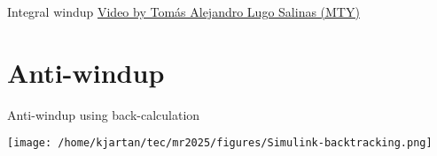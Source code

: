 \documentclass[presentation,aspectratio=169, usenames, dvipsnames]{beamer}
\begin{document}
\begin{frame}[label={sec:org80a68be}]{Integral windup}
\href{https://tecdemonterrey.instructuremedia.com/embed/6fb197b1-38a6-4938-b622-b25d4a45efcc}{Video by Tomás Alejandro Lugo Salinas (MTY)} 
\end{frame}

\section{Anti-windup}
\label{sec:orgd42714a}

\begin{frame}[label={sec:org2f303b6}]{Anti-windup using back-calculation}
\begin{center}
\texttt{[image: /home/kjartan/tec/mr2025/figures/Simulink-backtracking.png]}
\end{center}
\end{frame}
\end{document}
